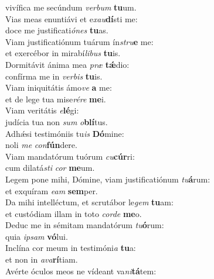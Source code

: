 \oddverse vivífica me secúndum \textit{ver}\textit{bum} \textbf{tu}um.\\
\evenverse Vias meas enuntiávi et e\textit{xau}\textbf{dí}sti me:~\*\\
\evenverse doce me justificati\textit{ó}\textit{nes} \textbf{tu}as.\\
\oddverse Viam justificatiónum tuárum ín\textit{stru}\textbf{e} me:~\*\\
\oddverse et exercébor in mirabí\textit{li}\textit{bus} \textbf{tu}is.\\
\evenverse Dormitávit ánima mea \textit{præ} \textbf{tǽ}dio:~\*\\
\evenverse confírma me in \textit{ver}\textit{bis} \textbf{tu}is.\\
\oddverse Viam iniquitátis ámo\textit{ve} \textbf{a} me:~\*\\
\oddverse et de lege tua mise\textit{ré}\textit{re} \textbf{me}i.\\
\evenverse Viam veritátis \textit{e}\textbf{lé}gi:~\*\\
\evenverse judícia tua non \textit{sum} \textit{o}\textbf{blí}tus.\\
\oddverse Adhǽsi testimóniis tu\textit{is} \textbf{Dó}mine:~\*\\
\oddverse noli \textit{me} \textit{con}\textbf{fún}dere.\\
\evenverse Viam mandatórum tuórum \textit{cu}\textbf{cúr}ri:~\*\\
\evenverse cum dilatá\textit{sti} \textit{cor} \textbf{me}um.\\
\oddverse Legem pone mihi, Dómine, viam justificatiónum \textit{tu}\textbf{á}rum:~\*\\
\oddverse et exquíram \textit{e}\textit{am} \textbf{sem}per.\\
\evenverse Da mihi intelléctum, et scrutábor le\textit{gem} \textbf{tu}am:~\*\\
\evenverse et custódiam illam in toto \textit{cor}\textit{de} \textbf{me}o.\\
\oddverse Deduc me in sémitam mandatórum \textit{tu}\textbf{ó}rum:~\*\\
\oddverse quia \textit{i}\textit{psam} \textbf{vó}lui.\\
\evenverse Inclína cor meum in testimóni\textit{a} \textbf{tu}a:~\*\\
\evenverse et non in \textit{a}\textit{va}\textbf{rí}tiam.\\
\oddverse Avérte óculos meos ne vídeant va\textit{ni}\textbf{tá}tem:~\*\\
